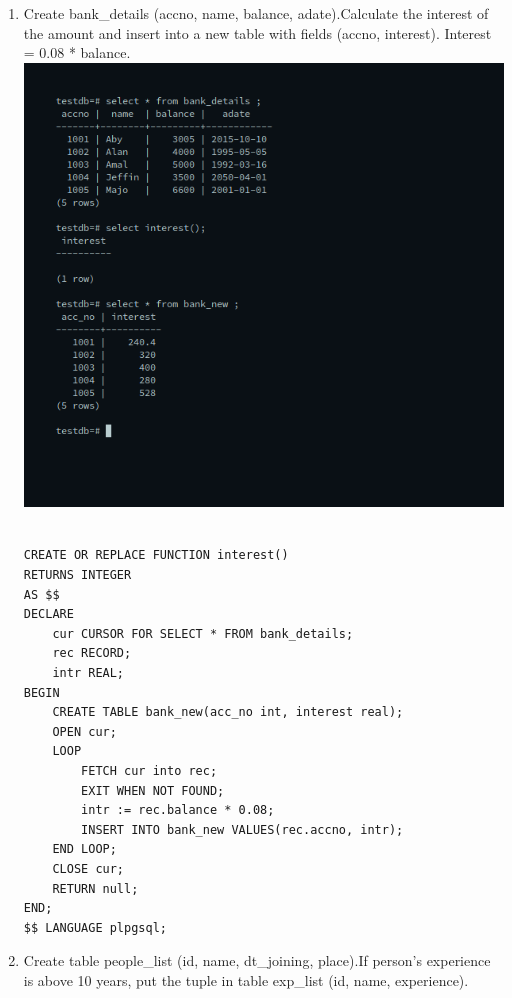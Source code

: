 \documentclass[10pt,a4paper,titlepage]{report}
\begin{document}
{\begin{enumerate}
	\item Create bank\_details (accno, name, balance, adate).Calculate the interest of the amount and insert into a new table with fields (accno, interest). Interest = 0.08 * balance.\newline
	\includegraphics[width=\linewidth]{../Images/Cursors/2.png}
	\begin{verbatim}
	
CREATE OR REPLACE FUNCTION interest()
RETURNS INTEGER
AS $$
DECLARE
	cur CURSOR FOR SELECT * FROM bank_details;
	rec RECORD;
	intr REAL;
BEGIN
	CREATE TABLE bank_new(acc_no int, interest real);
	OPEN cur;
	LOOP
		FETCH cur into rec;
		EXIT WHEN NOT FOUND;
		intr := rec.balance * 0.08;
		INSERT INTO bank_new VALUES(rec.accno, intr);
	END LOOP;
	CLOSE cur;
	RETURN null;
END;
$$ LANGUAGE plpgsql;
	\end{verbatim}

	\item Create table people\_list (id, name, dt\_joining, place).If person’s experience is above 10 years, put the tuple in table exp\_list (id, name, experience).\newline
	\begin{verbatim}


\end{verbatim}
\end{enumerate}}
\end{document}

